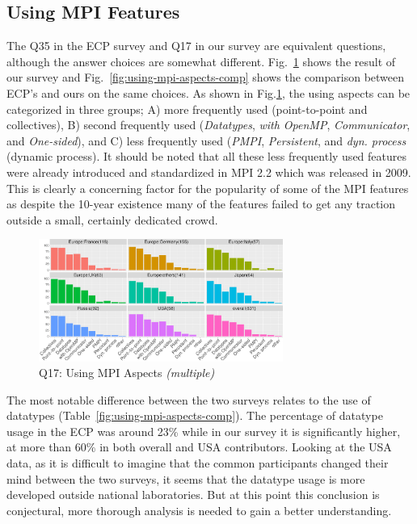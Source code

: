 \documentclass[preprint,5p,times]{elsarticle}
\def\myquote#1{{\it #1}}
\newcommand{\revision}[2]{{\color{blue}#2}}
\begin{document}
\subsection{Using MPI Features}\label{sec:mpi-aspects}

The Q35 in the ECP survey and Q17 in our survey are equivalent
questions, although the answer choices are somewhat
different. Fig.~\ref{fig:using-mpi-aspects} shows the result of our
survey and Fig.~\ref{fig:using-mpi-aspects-comp} shows the comparison
between ECP's and ours on the same choices. As shown in
Fig.\ref{fig:using-mpi-aspects}, the
using aspects can be categorized in three groups; A) more frequently
used (point-to-point and collectives), B) second frequently used
(\myquote{Datatypes}, \myquote{with OpenMP}, \myquote{Communicator}, and \myquote{One-sided}), and C) less
frequently used (\myquote{PMPI}, \myquote{Persistent}, and
\myquote{dyn. process} (dynamic process).
%
It should be noted that all these less frequently used features were already
introduced and standardized in MPI 2.2 which was \revision{release}{released} in 2009. This is
clearly a concerning factor for the popularity of some of the MPI features as
despite the 10-year existence many of the features failed to get any traction
outside a small, certainly dedicated crowd.

\begin{figure}[tb]
  \begin{center}
    \includegraphics[width=8.0cm]{R-scripts/Q17.pdf}
    \caption{Q17: Using MPI Aspects {\it(multiple)}}
    \label{fig:using-mpi-aspects}
\vspace{-3mm}%
  \end{center}
\end{figure}

The most notable difference between the two surveys relates to the use of
datatypes (Table~\ref{fig:using-mpi-aspects-comp}). The percentage of datatype usage
in the ECP was around 23\% while in our survey it is significantly higher, at
more than 60\% in both overall and USA contributors.
%
Looking at the USA data, as it is difficult to imagine that the common
participants changed their mind between the two surveys, it seems that the
datatype usage is more developed outside national laboratories. But at this
point this conclusion is conjectural, more thorough analysis is needed to gain a
better understanding.
\end{document}
